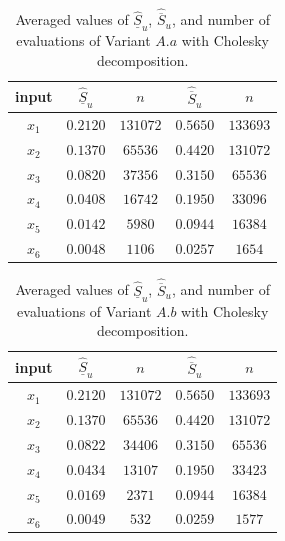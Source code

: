\begin{table}[!ht]
\caption{Averaged values of $\widehat{\underline{S}}_u$, ${\widehat{\overline{S}}_u}$, and number of evaluations of Variant $A.a$ with Cholesky decomposition.}
\centering
\begin{tabular}{ccccc}
\hline
 input & $\widehat{\underline{S}}_u$ & $n$ & $\widehat{\overline{S}}_u$ & $n$ \\ \hline
 $x_1$ & $0.2120$ & $131072$ & $0.5650$ & $133693$ \\ \hline
 $x_2$ & $0.1370$ & $65536$ & $0.4420$ & $131072$ \\ \hline
 $x_3$ & $0.0820$ & $37356$ & $0.3150$ & $65536$ \\ \hline
 $x_4$ & $0.0408$ & $16742$ & $0.1950$ & $33096$ \\ \hline
 $x_5$ & $0.0142$ & $5980$ & $0.0944$ & $16384$ \\ \hline
 $x_6$ & $0.0048$ & $1106$ & $0.0257$ & $1654$ \\ \hline \hline
\end{tabular}
\label{res.AsianChol.Aa}
\end{table}

\begin{table}[!ht]
\caption{Averaged values of $\widehat{\underline{S}}_u$, ${\widehat{\overline{S}}_u}$, and number of evaluations of Variant $A.b$ with Cholesky decomposition.}
\centering
\begin{tabular}{ccccc}
\hline
 input & $\widehat{\underline{S}}_u$ & $n$ & $\widehat{\overline{S}}_u$ & $n$ \\ \hline
 $x_1$ & $0.2120$ & $131072$ & $0.5650$ & $133693$ \\ \hline
 $x_2$ & $0.1370$ & $65536$ & $0.4420$ & $131072$ \\ \hline
 $x_3$ & $0.0822$ & $34406$ & $0.3150$ & $65536$ \\ \hline
 $x_4$ & $0.0434$ & $13107$ & $0.1950$ & $33423$ \\ \hline
 $x_5$ & $0.0169$ & $2371$ & $0.0944$ & $16384$ \\ \hline
 $x_6$ & $0.0049$ & $532$ & $0.0259$ & $1577$ \\ \hline \hline
\end{tabular}
\label{res.AsianChol.Ab}
\end{table}

